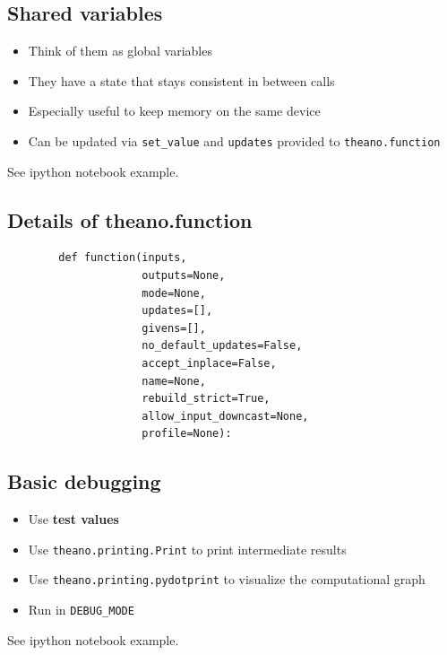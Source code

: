 \documentclass[9pt]{beamer}
\begin{document}
\subsection{Shared variables}
\begin{frame}
    \begin{itemize}
        \item Think of them as global variables
        \item They have a state that stays consistent in between calls
        \item Especially useful to keep memory on the same device 
        \item Can be updated via \texttt{set\_value} and \texttt{updates} provided 
        to \texttt{theano.function}
    \end{itemize}
    \bigskip
    See ipython notebook example.
\end{frame}
\subsection{Details of theano.function}
\begin{frame}[fragile]

    \begin{verbatim}
        def function(inputs, 
                     outputs=None, 
                     mode=None, 
                     updates=[], 
                     givens=[],
                     no_default_updates=False, 
                     accept_inplace=False, 
                     name=None,
                     rebuild_strict=True, 
                     allow_input_downcast=None, 
                     profile=None):
    \end{verbatim}
\end{frame}
\subsection{Basic debugging}
\begin{frame}
    \begin{itemize}
        \item Use {\bf test values}
        \item Use \texttt{theano.printing.Print} to print intermediate results
        \item Use \texttt{theano.printing.pydotprint} to visualize the
                computational graph
        \item Run in \texttt{DEBUG\_MODE}
    \end{itemize}
    \bigskip
    \begin{center}
    See ipython notebook example.
    \end{center}
\end{frame}
\end{document}

